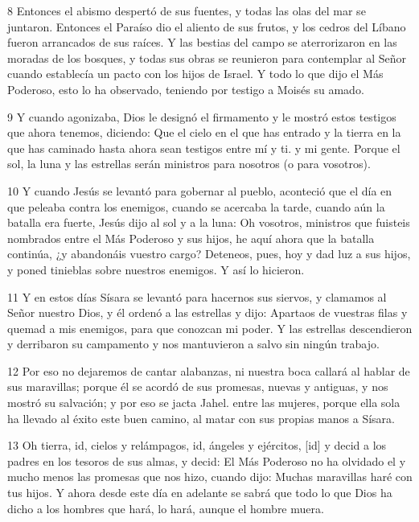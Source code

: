 \par 8 Entonces el abismo despertó de sus fuentes, y todas las olas del mar se juntaron. Entonces el Paraíso dio el aliento de sus frutos, y los cedros del Líbano fueron arrancados de sus raíces. Y las bestias del campo se aterrorizaron en las moradas de los bosques, y todas sus obras se reunieron para contemplar al Señor cuando establecía un pacto con los hijos de Israel. Y todo lo que dijo el Más Poderoso, esto lo ha observado, teniendo por testigo a Moisés su amado.

\par 9 Y cuando agonizaba, Dios le designó el firmamento y le mostró estos testigos que ahora tenemos, diciendo: Que el cielo en el que has entrado y la tierra en la que has caminado hasta ahora sean testigos entre mí y ti. y mi gente. Porque el sol, la luna y las estrellas serán ministros para nosotros (o para vosotros).

\par 10 Y cuando Jesús se levantó para gobernar al pueblo, aconteció que el día en que peleaba contra los enemigos, cuando se acercaba la tarde, cuando aún la batalla era fuerte, Jesús dijo al sol y a la luna: Oh vosotros, ministros que fuisteis nombrados entre el Más Poderoso y sus hijos, he aquí ahora que la batalla continúa, ¿y abandonáis vuestro cargo? Deteneos, pues, hoy y dad luz a sus hijos, y poned tinieblas sobre nuestros enemigos. Y así lo hicieron.

\par 11 Y en estos días Sísara se levantó para hacernos sus siervos, y clamamos al Señor nuestro Dios, y él ordenó a las estrellas y dijo: Apartaos de vuestras filas y quemad a mis enemigos, para que conozcan mi poder. Y las estrellas descendieron y derribaron su campamento y nos mantuvieron a salvo sin ningún trabajo.

\par 12 Por eso no dejaremos de cantar alabanzas, ni nuestra boca callará al hablar de sus maravillas; porque él se acordó de sus promesas, nuevas y antiguas, y nos mostró su salvación; y por eso se jacta Jahel. entre las mujeres, porque ella sola ha llevado al éxito este buen camino, al matar con sus propias manos a Sísara.

\par 13 Oh tierra, id, cielos y relámpagos, id, ángeles y ejércitos, [id] y decid a los padres en los tesoros de sus almas, y decid: El Más Poderoso no ha olvidado el y mucho menos las promesas que nos hizo, cuando dijo: Muchas maravillas haré con tus hijos. Y ahora desde este día en adelante se sabrá que todo lo que Dios ha dicho a los hombres que hará, lo hará, aunque el hombre muera.

